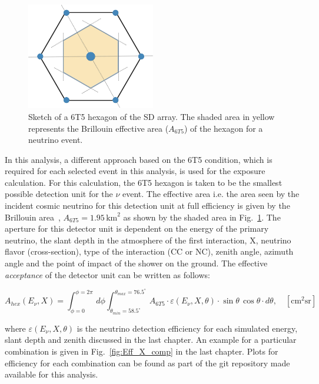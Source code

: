 \begin{figure}[t!]
  \centering
  \includegraphics[width=0.5\textwidth]{thesis_figures/ExpLimits/Brillouin_area.png}
  \caption{Sketch of a 6T5 hexagon of the SD array. The shaded area in yellow represents the Brillouin effective area ($A_{6T5}$) of the hexagon for a neutrino event.}
  \label{fig:Brillouin_area}
\end{figure}

In this analysis, a different approach based on the 6T5 condition, which is required for each selected event in this analysis, is used for the exposure calculation. For this calculation, the 6T5 hexagon is taken to be the smallest possible detection unit for the $\nu$ event. The effective area i.e. the area seen by the incident cosmic neutrino for this detection unit at full efficiency is given by the Brillouin area~\cite{PierreAuger:2010zof}, $A_{6T5} = 1.95\,\mathrm{km}^2$ as shown by the shaded area in Fig.~\ref{fig:Brillouin_area}. The aperture for this detector unit is dependent on the energy of the primary neutrino, the slant depth in the atmosphere of the first interaction, X, neutrino flavor (cross-section), type of the interaction (CC or NC), zenith angle, azimuth angle and the point of impact of the shower on the ground. The effective \textit{acceptance} of the detector unit can be written as follows:

\begin{equation}
  \label{eq:nu_accep}
  A_{hex}(E_{\nu}, X)  = \int^{\phi = 2\pi}_{\phi = 0} \,d\phi \int_{\theta_{min} = 58.5^{\circ}}^{\theta_{max}= 76.5^{\circ}}  \, A_{6T5} \cdot \varepsilon(E_{\nu}, X, \theta) \cdot \sin \theta \, \cos \theta \cdot d\theta, \quad   \mathrm{[cm^2 sr]}
\end{equation}

where $\varepsilon(E_{\nu}, X, \theta)$ is the neutrino detection efficiency for each simulated energy, slant depth and zenith discussed in the last chapter. An example for a particular combination is given in Fig.~\ref{fig:Eff_X_comp} in the last chapter. Plots for efficiency for each combination can be found as part of the git repository made available for this analysis.

